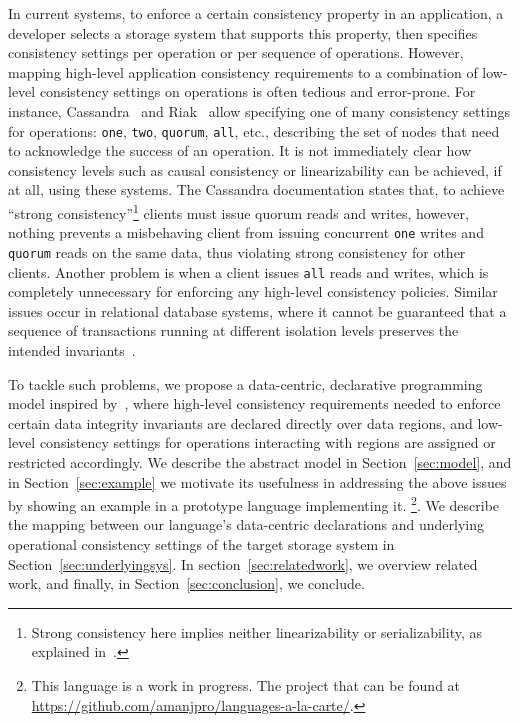 \documentclass[preprint,numbers]{sigplanconf}
\begin{document}
In current systems, to enforce a certain consistency
property in an application, a developer selects a storage system that
supports this property, then specifies consistency settings per
operation or per sequence of operations. However, mapping high-level 
application consistency requirements to a combination of
low-level consistency settings on operations is often tedious and error-prone.
For instance, Cassandra~\cite{lakshman2010cassandra} and Riak~\cite{riak} allow 
specifying one of many consistency settings for operations:
\texttt{one}, \texttt{two}, \texttt{quorum}, \texttt{all}, etc., describing
the set of nodes that need to acknowledge the success of an operation. It
is not immediately clear how consistency levels such as causal consistency or
linearizability can be achieved, if at all, using these systems. The Cassandra documentation
states that, to achieve ``strong consistency''\footnote{Strong consistency here implies
neither linearizability or serializability, as explained 
in~\cite{sivaramakrishnan2016representation}.} clients must issue quorum reads and writes,
however, nothing prevents a misbehaving client from issuing concurrent \texttt{one} writes and
\texttt{quorum} reads on the same data, thus violating strong consistency for other clients. Another
problem is when a client issues \texttt{all} reads and writes, which is completely
unnecessary for enforcing any high-level consistency policies. Similar issues
occur in relational database systems, where it cannot be guaranteed that a
sequence of transactions running at different isolation levels preserves the intended
invariants~\cite{gray1992transaction}. 

To tackle such problems, we propose a data-centric, declarative programming
model inspired by~\cite{dolby2012data}, where high-level consistency
requirements needed to enforce certain data integrity invariants 
are declared directly over data regions, and low-level 
consistency settings for operations interacting with
regions are assigned or restricted accordingly. We
describe the abstract model in Section~\ref{sec:model}, and in
Section~\ref{sec:example} we motivate its usefulness in addressing the above 
issues by showing an example in a prototype language implementing it.
\footnote{This language is a work in progress. The project that can be found at
  \url{https://github.com/amanjpro/languages-a-la-carte/}.}.
We describe the mapping between our language's data-centric declarations and 
underlying operational consistency settings of the target storage system in 
Section~\ref{sec:underlyingsys}.  In section~\ref{sec:relatedwork}, we overview 
related work, and finally, in Section~\ref{sec:conclusion}, we conclude.
\end{document}

